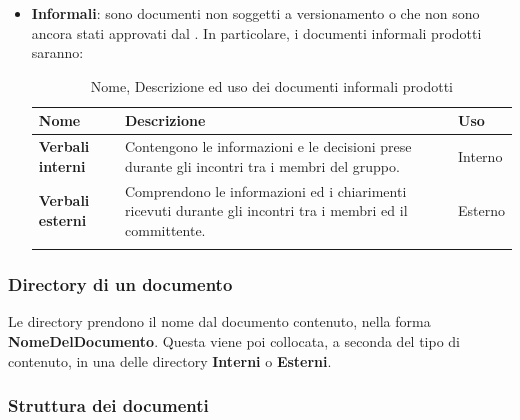 {\begin{itemize}
\item \textbf{Informali}: sono documenti non soggetti a versionamento o che non sono ancora stati approvati dal \RdP{}. \newline 
In particolare, i documenti informali prodotti saranno:
{
	\setlength{\freewidth}{\dimexpr\textwidth-1\tabcolsep}
	\renewcommand{\arraystretch}{1.5}
	\setlength{\aboverulesep}{0pt}
	\setlength{\belowrulesep}{0pt}
	\begin{longtable}{L{.210\freewidth} L{.6\freewidth} L{.080\freewidth}}
		\textbf{Nome} & \textbf{Descrizione} & \textbf{Uso}\\
		\toprule
		\endhead		
		\textbf{Verbali interni} & Contengono le informazioni e le decisioni prese durante gli incontri tra i membri del gruppo. & Interno \\ 
		\textbf{Verbali esterni} & Comprendono le informazioni ed i chiarimenti ricevuti durante gli incontri tra i membri ed il committente. & Esterno \\
		\bottomrule
		\hiderowcolors
		\caption{Nome, Descrizione ed uso dei documenti informali prodotti}
	\end{longtable}
}
\end{itemize}
\subsubsection{Directory di un documento}
Le directory prendono il nome dal documento contenuto, nella forma \textbf{NomeDelDocumento}. Questa viene poi collocata, a seconda del tipo di contenuto, in una delle directory \textbf{Interni} o \textbf{Esterni}. 
\subsubsection{Struttura dei documenti}
}
